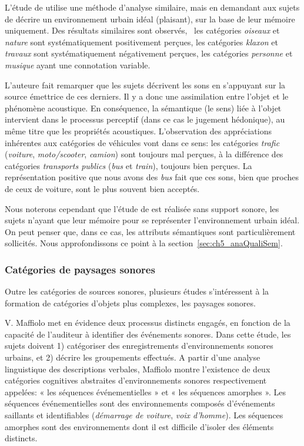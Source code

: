 L'étude de \citep{guastavino2006ideal} utilise une méthode d'analyse similaire, mais en demandant aux sujets de décrire un environnement urbain idéal (plaisant), sur la base de leur mémoire uniquement. Des résultats similaires sont observés, \ie~les catégories \emph{oiseaux} et \emph{nature} sont systématiquement positivement perçues, les catégories \emph{klaxon} et \emph{travaux} sont systématiquement négativement perçues, les catégories \emph{personne} et \emph{musique} ayant une connotation variable.

L'auteure fait remarquer que les sujets décrivent les sons en s'appuyant sur la source émettrice de ces derniers. Il y a donc une assimilation entre l'objet et le phénomène acoustique. En conséquence, la sémantique (le sens) liée à l'objet intervient dans le processus perceptif (dans ce cas le jugement hédonique), au même titre que les propriétés acoustiques. L'observation des appréciations inhérentes aux catégories de véhicules vont dans ce sens: les catégories \emph{trafic} (\emph{voiture}, \emph{moto/scooter}, \emph{camion}) sont toujours mal perçues, à la différence des catégories \emph{transports publics} (\emph{bus} et \emph{train}), toujours bien perçues. La représentation positive que nous avons des \emph{bus} fait que ces sons, bien que proches de ceux de voiture, sont le plus souvent bien acceptés.  

Nous noterons cependant que l'étude de \citep{guastavino2006ideal} est réalisée sans support sonore, les sujets n'ayant que leur mémoire pour se représenter l'environnement urbain idéal. On peut penser que, dans ce cas, les attributs sémantiques sont particulièrement sollicités. Nous approfondissons ce point à la section~\ref{sec:ch5_anaQualiSem}.  

\subsubsection{Catégories de paysages sonores}
\label{sec:ch3_catsoundscape}

Outre les catégories de sources sonores, plusieurs études s’intéressent à la formation de catégories d'objets plus complexes, les paysages sonores.

V. Maffiolo \citep{maffiolo_caracterisation_1999} met en évidence deux processus distincts engagés, en fonction de la capacité de l'auditeur à identifier des événements sonores. Dans cette étude, les sujets doivent 1) catégoriser des enregistrements d'environnements sonores urbains, et 2) décrire les groupements effectués. A partir d'une analyse linguistique des descriptions verbales, Maffiolo montre l'existence de deux catégories cognitives abstraites d'environnements sonores respectivement appelées: « les séquences événementielles » et « les séquences amorphes ». Les séquences événementielles sont des environnements composés d'événements saillants et identifiables (\emph{démarrage de voiture}, \emph{voix d'homme}). Les séquences amorphes sont des environnements dont il est difficile d'isoler des éléments distincts.

